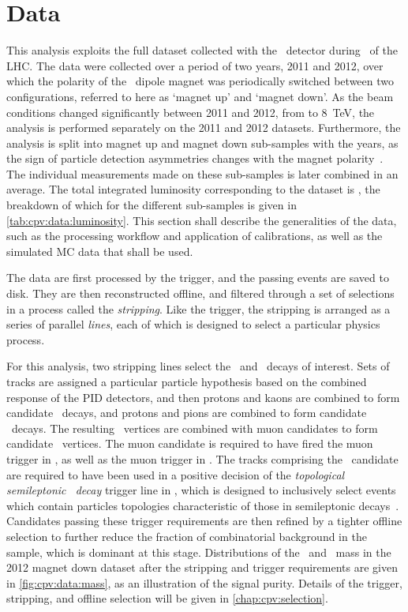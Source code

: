 \chapter{Data}
\label{chap:cpv:data}

This analysis exploits the full dataset collected with the \lhcb\ detector 
during \runone\ of the \ac{LHC}.
The data were collected over a period of two years, 2011 and 2012, over which 
the polarity of the \lhcb\ dipole magnet was periodically switched between two 
configurations, referred to here as `magnet up' and `magnet down'.
As the beam conditions changed significantly between 2011 and 2012, from 
 to \SI{8}{\TeV}, the analysis is performed separately on the 2011 
and 2012 datasets.
Furthermore, the analysis is split into magnet up and magnet down sub-samples 
with the years, as the sign of particle detection asymmetries changes with the 
magnet polarity~\cite{Vesterinen:1642153}.
The individual measurements made on these sub-samples is later combined in an 
average.
The total integrated luminosity corresponding to the dataset is \totlumi, the 
breakdown of which for the different sub-samples is given in 
\cref{tab:cpv:data:luminosity}.
This section shall describe the generalities of the data, such as the 
processing workflow and application of calibrations, as well as the simulated 
\ac{MC} data that shall be used.

The data are first processed by the trigger, and the passing events are saved 
to disk.
They are then reconstructed offline, and filtered through a set of selections 
in a process called the \emph{stripping}.
Like the trigger, the stripping is arranged as a series of parallel 
\emph{lines}, each of which is designed to select a particular physics process.

For this analysis, two stripping lines select the \LcTopKK\ and \LcToppipi\ 
decays of interest.
Sets of tracks are assigned a particular particle hypothesis based on the 
combined response of the \ac{PID} detectors, and then protons and kaons are 
combined to form candidate \pKK\ decays, and protons and pions are combined to 
form candidate \ppipi\ decays.
The resulting \PLambdac\ vertices are combined with muon candidates to form 
candidate \PLambdab\ vertices.
The muon candidate is required to have fired the muon trigger in \lzero, as 
well as the muon trigger in \hltone.
The tracks comprising the \PLambdab\ candidate are required to have been used 
in a positive decision of the \emph{topological semileptonic \PB\ decay} 
trigger line in \hlttwo, which is designed to inclusively select events which 
contain particles topologies characteristic of those in semileptonic \PB 
decays~\cite{Gligorov:2011qxa}.
Candidates passing these trigger requirements are then refined by a tighter 
offline selection to further reduce the fraction of combinatorial background in 
the sample, which is dominant at this stage.
Distributions of the \pKK\ and \ppipi\ mass in the 2012 magnet down dataset 
after the stripping and trigger requirements are given in 
\cref{fig:cpv:data:mass}, as an illustration of the signal purity.
Details of the trigger, stripping, and offline selection will be given in 
\cref{chap:cpv:selection}.

